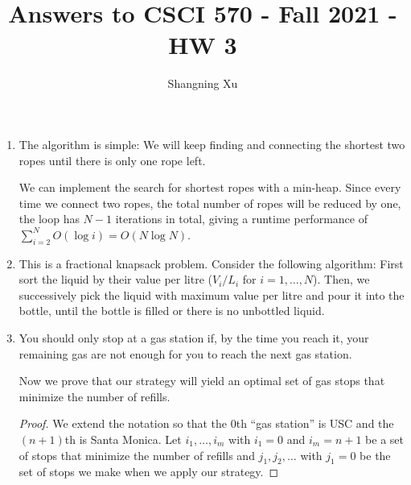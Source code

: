\documentclass{article}
\title{Answers to CSCI 570 - Fall 2021 - HW 3}
\author{Shangning Xu}
\begin{document}
\maketitle

\begin{enumerate}

\item The algorithm is simple: We will keep finding and connecting the shortest two ropes until there is only one rope left.

We can implement the search for shortest ropes with a min-heap. Since every time we connect two ropes, the total number of ropes will be reduced by one, the loop has $N - 1$ iterations in total, giving a runtime performance of $\sum_{i = 2}^N O(\log i) = O(N\log N)$.

\item This is a fractional knapsack problem. Consider the following algorithm: First sort the liquid by their value per litre ($V_i/L_i$ for $i = 1, \dots, N$). Then, we successively pick the liquid with maximum value per litre and pour it into the bottle, until the bottle is filled or there is no unbottled liquid.

\item You should only stop at a gas station if, by the time you reach it, your remaining gas are not enough for you to reach the next gas station.

Now we prove that our strategy will yield an optimal set of gas stops that minimize the number of refills.

\begin{proof}
    We extend the notation so that the 0th ``gas station'' is USC and the $(n + 
    1)$th is Santa Monica. Let $i_1, \dots, i_m$ with $i_1 = 0$ and $i_m = n + 1$ be a set of stops that minimize the number of refills and $j_1, j_2, \dots$ with $j_1 = 0$ be the set of stops we make when we apply our strategy.


\end{proof}
\end{enumerate}
\end{document}
